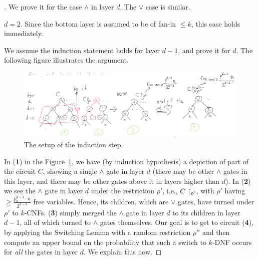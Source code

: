 \begin{proof}[]
We prove it for the case $\land$ in layer $d$. The $\lor$ case is similar.  

\Base $d = 2$. Since the bottom layer is assumed to be of fan-in $\leq k$,  
this case holds immediately.  

\Induction   
We assume the induction statement holds for layer $d-1$, and prove it for $d$. The following figure illustrates the argument. 




\begin{figure}[H]
    \begin{center}
    \includegraphics[width=\textwidth]{images/switchinginduc.png}
    \end{center}\label{fig:depth-reduction-use}
    \caption{The setup of the induction step.}
\end{figure}
 In (\textbf{1}) in the  Figure~\ref{fig:depth-reduction-use},  we have (by induction hypothesis) a depiction of part of the circuit $C$, showing a single $\land$ gate in layer $d$ (there  may be other $\land$ gates in this layer, and there may be other gates above it in layers higher than $d$). 
In (\textbf{2}) we see the $\land$ gate in layer $d$ under the restriction $\rho'$, i.e., $C\upharpoonright_{\rho'}$, with $\rho'$ having $\geq \frac{p_0^{d-3} \cdot n}{2^{d-3}}$ free variables. Hence, its children, which are $\lor$ gates, have turned under $\rho'$ to  $k$-CNFs.
 (\textbf{3}) simply merged the $\land$ gate in layer $d$ to its children in layer $d-1$, all of which turned to $\land$ gates themselves. 
Our goal is to get to circuit (\textbf{4}), by applying the Switching Lemma with a random restriction $\rho''$ and then compute an upper bound on the probability that such a switch to $k$-DNF occurs for \emph{all} the gates in layer $d$. We explain this now.


\smallskip 




\end{proof}
